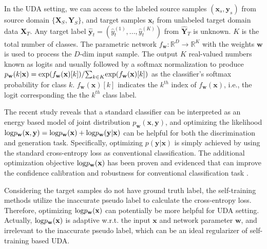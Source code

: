 \documentclass[a4paper,conference]{IEEEtran}
\theoremstyle{plain}%
\begin{document}
In the UDA setting, we can access to the labeled source samples $(\mathbf{x}_s,\mathbf{y}_s)$ from source domain $\{\mathbf{X}_S, \mathbf{Y}_S\}$, and target samples $\mathbf{x}_t$ from unlabeled target domain data $\mathbf{X}_T$. Any target label $\hat{\mathbf{y}}_t=(\hat{y}_t^{(1)},...,\hat{y}_t^{(K)})$ from $\hat{\mathbf{Y}}_T$ is unknown. $K$ is the total number of classes. The parametric network $f_{\mathbf{w}}:\mathbb{R}^D\rightarrow \mathbb{R}^K$ with the weights $\mathbf{w}$ is used to process the $D$-dim input sample. The output $K$ real-valued numbers known as logits and usually followed by a softmax normalization to produce ${p_\mathbf{w}}(k|\mathbf{x})={\rm exp}({f_{\mathbf{w}}}({\mathbf{x}})[k]) / {\sum_{k\in K}}{\rm exp}({f_{\mathbf{w}}}({\mathbf{x}})[k])$ as the classifier's softmax probability for class $k$. $f_{\mathbf{w}}({\mathbf{x}})[k]$ indicates the $k^{th}$ index of $f_{\mathbf{w}}({\mathbf{x}})$, i.e., the logit corresponding the the $k^{th}$ class label.



The recent study \cite{grathwohl2019your} reveals that a standard classifier can be interpreted as an energy based model of joint distribution $p_{\mathbf{w}}(\mathbf{x},\mathbf{y})$, and optimizing the likelihood ${\rm log}p_{\mathbf{w}}(\mathbf{x},\mathbf{y})={\rm log}p_{\mathbf{w}}(\mathbf{x})+{\rm log}p_{\mathbf{w}}(\mathbf{y}|\mathbf{x})$ can be helpful for both the discrimination and generation task. Specifically, optimizing $p(\mathbf{y}|\mathbf{x})$ is simply achieved by using the standard cross-entropy loss as conventional classification. The additional optimization objective ${\rm log}p_{\mathbf{w}}(\mathbf{x})$ has been proven and evidenced that can improve the confidence calibration and robustness for conventional classification task \cite{grathwohl2019your}.  

Considering the target samples do not have ground truth label, the self-training methods \cite{zou2019confidence} utilize the inaccurate pseudo label to calculate the cross-entropy loss. Therefore, optimizing ${\rm log}p_{\mathbf{w}}(\mathbf{x})$ can potentially be more helpful for UDA setting. Actually, ${\rm log}p_{\mathbf{w}}(\mathbf{x})$ is adaptive w.r.t. the input $\mathbf{x}$ and network parameter $\mathbf{w}$, and irrelevant to the inaccurate pseudo label, which can be an ideal regularizer of self-training based UDA. 
\end{document}
